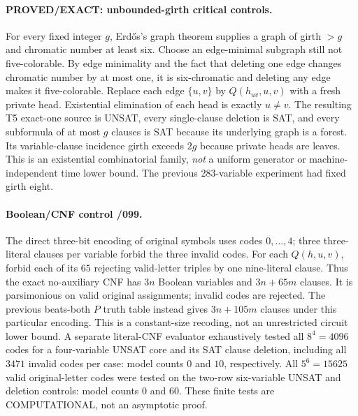 \documentclass[11pt]{article}
\begin{document}
\paragraph{PROVED/EXACT: unbounded-girth critical controls.}
For every fixed integer $g$, Erd\H{o}s's graph theorem supplies a graph
of girth $>g$ and chromatic number at least six.
Choose an edge-minimal subgraph still not five-colorable.
By edge minimality and the fact that deleting one edge changes
chromatic number by at most one, it is six-chromatic and deleting
any edge makes it five-colorable. Replace each edge $\{u,v\}$
by $Q(h_{uv},u,v)$ with a fresh private head.
Existential elimination of each head is exactly $u\ne v$.
The resulting T5 exact-one source is UNSAT, every single-clause
deletion is SAT, and every subformula of at most $g$ clauses is
SAT because its underlying graph is a forest. Its variable-clause
incidence girth exceeds $2g$ because private heads are leaves.
This is an existential combinatorial family, \emph{not} a uniform
generator or machine-independent time lower bound. The previous
283-variable experiment had fixed girth eight.

\paragraph{Boolean/CNF control /099.}
The direct three-bit encoding of original symbols uses codes $0,\ldots,4$;
three three-literal clauses per variable forbid the three invalid codes.
For each $Q(h,u,v)$, forbid each of its $65$ rejecting valid-letter triples
by one nine-literal clause. Thus the exact no-auxiliary CNF has
$3n$ Boolean variables and $3n+65m$ clauses. It is parsimonious on
valid original assignments; invalid codes are rejected. The previous
beats-both $P$ truth table instead gives $3n+105m$ clauses under
this particular encoding. This is a constant-size recoding, not an
unrestricted circuit lower bound. A separate literal-CNF evaluator
exhaustively tested all $8^4=4096$ codes for a four-variable UNSAT core
and its SAT clause deletion, including all $3471$ invalid codes per
case: model counts $0$ and $10$, respectively. All $5^6=15625$ valid
original-letter codes were tested on the two-row six-variable UNSAT
and deletion controls: model counts $0$ and $60$.
These finite tests are COMPUTATIONAL, not an asymptotic proof.
\end{document}
